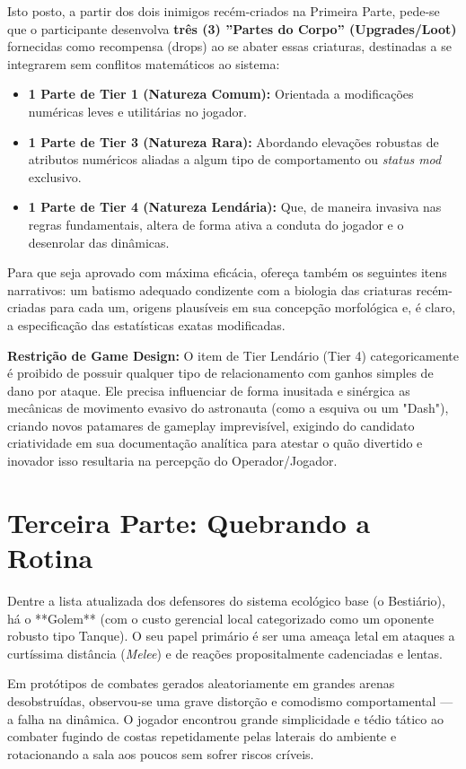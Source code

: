 \documentclass[a4paper, 12pt,  oneside,a4paper,english,french,spanish,brazil]{book}     %
\begin{document}
Isto posto, a partir dos dois inimigos recém-criados na Primeira Parte, pede-se que o participante desenvolva \textbf{três (3) ''Partes do Corpo'' (Upgrades/Loot)} fornecidas como recompensa (drops) ao se abater essas criaturas, destinadas a se integrarem sem conflitos matemáticos ao sistema:

\begin{itemize}
    \item \textbf{1 Parte de Tier 1 (Natureza Comum):} Orientada a modificações numéricas leves e utilitárias no jogador.
    \item \textbf{1 Parte de Tier 3 (Natureza Rara):} Abordando elevações robustas de atributos numéricos aliadas a algum tipo de comportamento ou \textit{status mod} exclusivo. 
    \item \textbf{1 Parte de Tier 4 (Natureza Lendária):} Que, de maneira invasiva nas regras fundamentais, altera de forma ativa a conduta do jogador e o desenrolar das dinâmicas.
\end{itemize}

Para que seja aprovado com máxima eficácia, ofereça também os seguintes itens narrativos: um batismo adequado condizente com a biologia das criaturas recém-criadas para cada um, origens plausíveis em sua concepção morfológica e, é claro, a especificação das estatísticas exatas modificadas. 

\textbf{Restrição de Game Design:} O item de Tier Lendário (Tier 4) categoricamente é proibido de possuir qualquer tipo de relacionamento com ganhos simples de dano por ataque. Ele precisa influenciar de forma inusitada e sinérgica as mecânicas de movimento evasivo do astronauta (como a esquiva ou um "Dash"), criando novos patamares de gameplay imprevisível, exigindo do candidato criatividade em sua documentação analítica para atestar o quão divertido e inovador isso resultaria na percepção do Operador/Jogador.

\section*{Terceira Parte: Quebrando a Rotina}

Dentre a lista atualizada dos defensores do sistema ecológico base (o Bestiário), há o **Golem** (com o custo gerencial local categorizado como um oponente robusto tipo Tanque). O seu papel primário é ser uma ameaça letal em ataques a curtíssima distância (\textit{Melee}) e de reações propositalmente cadenciadas e lentas.

Em protótipos de combates gerados aleatoriamente em grandes arenas desobstruídas, observou-se uma grave distorção e comodismo comportamental — a falha na dinâmica. O jogador encontrou grande simplicidade e tédio tático ao combater fugindo de costas repetidamente pelas laterais do ambiente e rotacionando a sala aos poucos sem sofrer riscos críveis.
\end{document}
